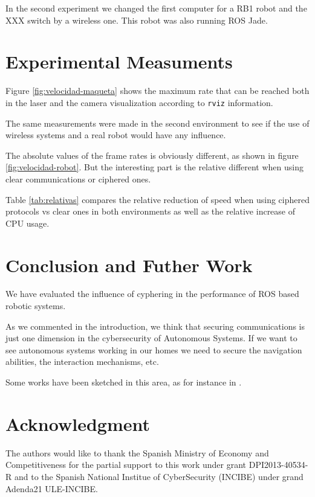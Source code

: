 \documentclass[journal,twoside]{JoPhA}
\begin{document}
In the second experiment we changed the first computer for a RB1 robot and the XXX switch by a wireless one. This robot was also running ROS Jade.



\section{Experimental Measuments}

Figure \ref{fig:velocidad-maqueta} shows the maximum rate that can be reached both in the laser and the camera visualization according to \texttt{rviz} information.

The same measurements were made in the second environment to see if the use of wireless systems and a real robot would have any influence.

The absolute values of the frame rates is obviously different, as shown in figure \ref{fig:velocidad-robot}. But the interesting part is the relative different when using clear communications or ciphered ones. 

Table \ref{tab:relativas}  compares the relative reduction of speed when using ciphered protocols vs clear ones in both environments as well as the relative increase of CPU usage.

\section{Conclusion and Futher Work}

We have evaluated the influence of cyphering in the performance of ROS based robotic systems.

As we commented in the introduction, we think that securing communications is just one dimension in  the cybersecurity of Autonomous Systems. If we want to see autonomous systems working in our homes we need to secure the navigation abilities, the interaction mechanisms, etc. 
 
Some works have been sketched in this area, as for instance in \cite{Guiochet2016}.




\section*{Acknowledgment}
The authors would  like to thank the Spanish Ministry of Economy and Competitiveness for the partial support to this work under grant DPI2013-40534-R and to the Spanish National Institue of CyberSecurity (INCIBE) under grand Adenda21 ULE-INCIBE.

 

\end{document}
